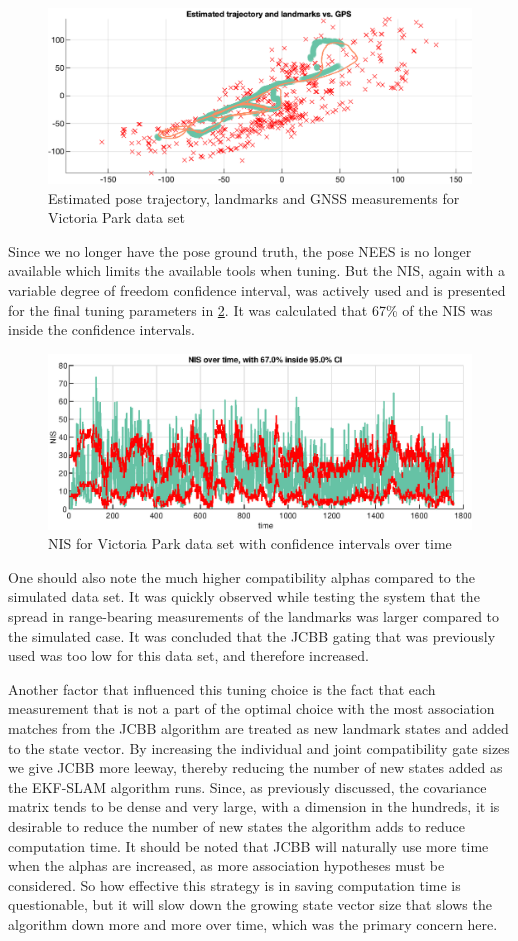 \begin{figure}[!htb]
    \centering
    \includegraphics[width=0.6\linewidth]{figures/ga_3/real_trajectory.eps}
    \caption{Estimated pose trajectory, landmarks and GNSS measurements for Victoria Park data set}
    \label{fig:ga_3_real_trajectory}
\end{figure}

Since we no longer have the pose ground truth, the pose NEES is no longer available which limits the available tools when tuning. But the NIS, again with a variable degree of freedom confidence interval, was actively used and is presented for the final tuning parameters in \cref{fig:ga_3_real_NIS}. It was calculated that 67\% of the NIS was inside the confidence intervals.  

\begin{figure}[!htb]
    \centering
    \includegraphics[width=0.7\linewidth]{figures/ga_3/real_NIS.eps}
    \caption{NIS for Victoria Park data set with confidence intervals over time}
    \label{fig:ga_3_real_NIS}
\end{figure}

One should also note the much higher compatibility alphas compared to the simulated data set. It was quickly observed while testing the system that the spread in range-bearing measurements of the landmarks was larger compared to the simulated case. It was concluded that the JCBB gating that was previously used was too low for this data set, and therefore increased.

Another factor that influenced this tuning choice is the fact that each measurement that is not a part of the optimal choice with the most association matches from the JCBB algorithm are treated as new landmark states and added to the state vector. By increasing the individual and joint compatibility gate sizes we give JCBB more leeway, thereby reducing the number of new states added as the EKF-SLAM algorithm runs. Since, as previously discussed, the covariance matrix tends to be dense and very large, with a dimension in the hundreds, it is desirable to reduce the number of new states the algorithm adds to reduce computation time. It should be noted that JCBB will naturally use more time when the alphas are increased, as more association hypotheses must be considered. So how effective this strategy is in saving computation time is questionable, but it will slow down the growing state vector size that slows the algorithm down more and more over time, which was the primary concern here. 

